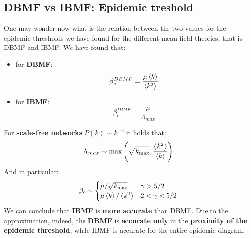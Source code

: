 \documentclass[../main/main.tex]{subfiles}
\begin{document}
\subsection{DBMF vs IBMF: Epidemic treshold}
One may wonder now what is the relation between the two values for the epidemic thresholds we have found for the different mean-field theories, that is DBMF and IBMF. We have found that:
\begin{itemize}
\item for \textbf{DBMF}:
\begin{equation*}
  \beta _c^{DBMF} = \frac{\mu \expval{k} }{\expval{k^2} }
\end{equation*}

\item for \textbf{IBMF}:
\begin{equation*}
\beta _c^{IBMF} = \frac{\mu }{\Lambda _{max}}
\end{equation*}
\end{itemize}
For \textbf{scale-free networks} \( P(k) \sim k^{-\gamma  } \) it holds that:
\begin{equation}
  \Lambda _{max} \sim \max \qty(\sqrt{k_{\max}}, \frac{\expval{k^2}}{\expval{k}}   )
\end{equation}
And in particular:
\begin{equation}
\beta _c \sim
  \begin{cases}
   \mu / \sqrt{k_{\max}} & \gamma > 5/2  \\
   \mu \expval{k}/\expval{k^2} & 2 < \gamma < 5/2
  \end{cases}
\end{equation}
We can conclude that \textbf{IBMF} is \textbf{more accurate} than DBMF. Due to the approximation, indeed, the \textbf{DBMF} is  \textbf{accurate only} in the \textbf{proximity of the epidemic threshold}, while IBMF is accurate for the entire epidemic diagram.
\end{document}
